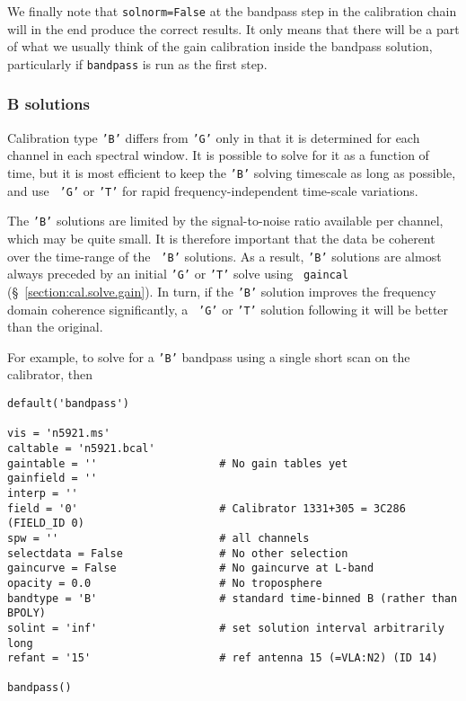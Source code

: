 We finally note that {\tt solnorm=False} at the bandpass step in the
calibration chain will in the end produce the correct results.  It
only means that there will be a part of what we usually think of the
gain calibration inside the bandpass solution, particularly if
{\tt bandpass} is run as the first step.

\subsubsection{B solutions}
\label{section:cal.solve.band.b}

Calibration type {\tt 'B'} differs from {\tt 'G'} only in that it is
determined for each channel in each spectral window.  It is possible
to solve for it as a function of time, but it is most efficient to
keep the {\tt 'B'} solving timescale as long as possible, and use {\tt
'G'} or {\tt 'T'} for rapid frequency-independent time-scale variations.

The {\tt 'B'} solutions are limited by the signal-to-noise ratio
available per channel, which may be quite small.  It is therefore
important that the data be coherent over the time-range of the {\tt
'B'} solutions.  As a result, {\tt 'B'} solutions are almost always
preceded by an initial {\tt 'G'} or {\tt 'T'} solve using {\tt
gaincal} (\S~\ref{section:cal.solve.gain}).  In turn, if the {\tt 'B'}
solution improves the frequency domain coherence significantly, a {\tt
'G'} or {\tt 'T'} solution following it will be better than the
original.

For example, to solve for a {\tt 'B'} bandpass using a single short
scan on the calibrator, then
\small
\begin{verbatim}
default('bandpass')

vis = 'n5921.ms'
caltable = 'n5921.bcal'
gaintable = ''                   # No gain tables yet
gainfield = ''
interp = ''
field = '0'                      # Calibrator 1331+305 = 3C286 (FIELD_ID 0)
spw = ''                         # all channels
selectdata = False               # No other selection
gaincurve = False                # No gaincurve at L-band
opacity = 0.0                    # No troposphere
bandtype = 'B'                   # standard time-binned B (rather than BPOLY)
solint = 'inf'                   # set solution interval arbitrarily long
refant = '15'                    # ref antenna 15 (=VLA:N2) (ID 14)

bandpass()
\end{verbatim}
\normalsize

